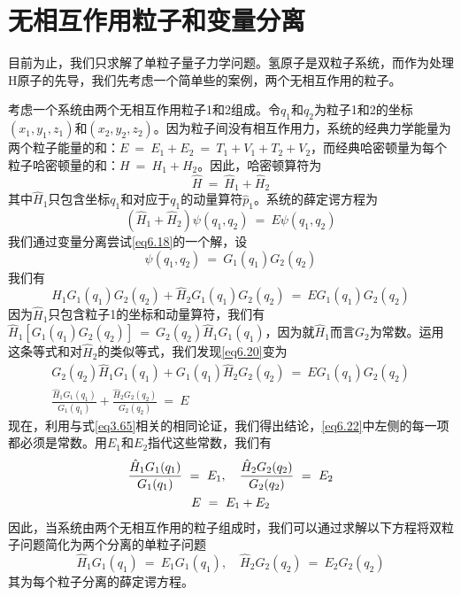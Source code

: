 \documentclass[12pt,a4paper,openany]{ctexbook}
\newcommand{\Ham}{\hat{H}}
\begin{document}
\section{无相互作用粒子和变量分离}
\begin{flushleft}
    \setlength{\parindent}{2em}
目前为止，我们只求解了单粒子量子力学问题。氢原子是双粒子系统，而作为处理H原子的先导，我们先考虑一个简单些的案例，两个无相互作用的粒子。

考虑一个系统由两个无相互作用粒子1和2组成。令$q_1$和$q_2$为粒子1和2的坐标$(x_1,y_1,z_1)$和$(x_2,y_2,z_2)$。因为粒子间没有相互作用力，系统的经典力学能量为两个粒子能量的和：$E\ =\ E_1+E_2\ =\ T_1+V_1+T_2+V_2$，而经典哈密顿量为每个粒子哈密顿量的和：$H\ =\ H_1+H_2$。因此，哈密顿算符为
\begin{equation*}
    \hat{H}\ =\ \Ham_1+\Ham_2
\end{equation*}
其中$\Ham_1$只包含坐标$q_1$和对应于$q_1$的动量算符$\hat{p}_1$。系统的薛定谔方程为
\begin{equation}
    (\Ham_1+\Ham_2)\psi(q_1,q_2)\ =\ E\psi(q_1,q_2) \label{eq6.18}
\end{equation}
我们通过变量分离尝试\eqref{eq6.18}的一个解，设
\begin{equation}
    \psi(q_1,q_2)\ =\ G_1(q_1)G_2(q_2) \label{eq6.19}
\end{equation}
我们有
\begin{equation}
    \Ham_1G_1(q_1)G_2(q_2)+\Ham_2G_1(q_1)G_2(q_2)\ =\ EG_1(q_1)G_2(q_2) \label{eq6.20}
\end{equation}
因为$\Ham_1$只包含粒子1的坐标和动量算符，我们有$\Ham_1[G_1(q_1)G_2(q_2)]\ =\ G_2(q_2)\Ham_1G_1(q_1)$，因为就$\Ham_1$而言$G_2$为常数。运用这条等式和对$\Ham_2$的类似等式，我们发现\eqref{eq6.20}变为
\begin{gather}
    G_2(q_2)\Ham_1G_1(q_1)+G_1(q_1)\Ham_2G_2(q_2)\ =\ EG_1(q_1)G_2(q_2) \label{eq6.21} \\
    \frac{\Ham_1G_1(q_1)}{G_1(q_1)}+\frac{\Ham_2G_2(q_2)}{G_2(q_2)}\ =\ E \label{eq6.22}
\end{gather}
现在，利用与式\eqref{eq3.65}相关的相同论证，我们得出结论，\eqref{eq6.22}中左侧的每一项都必须是常数。用$E_1$和$E_2$指代这些常数，我们有
\begin{gather}
    \frac{\Ham_1G_1(q_1)}{G_1(q_1)}\ =\ E_1,\quad\frac{\Ham_2G_2(q_2)}{G_2(q_2)}\ =\ E_2 \notag \\
    E\ =\ E_1+E_2 \label{eq6.23}
\end{gather}
因此，当系统由两个无相互作用的粒子组成时，我们可以通过求解以下方程将双粒子问题简化为两个分离的单粒子问题
\begin{equation}
    \Ham_1G_1(q_1)\ =\ E_1G_1(q_1),\quad\Ham_2G_2(q_2)\ =\ E_2G_2(q_2) \label{eq6.24}
\end{equation}
其为每个粒子分离的薛定谔方程。


\end{flushleft}
\end{document}
